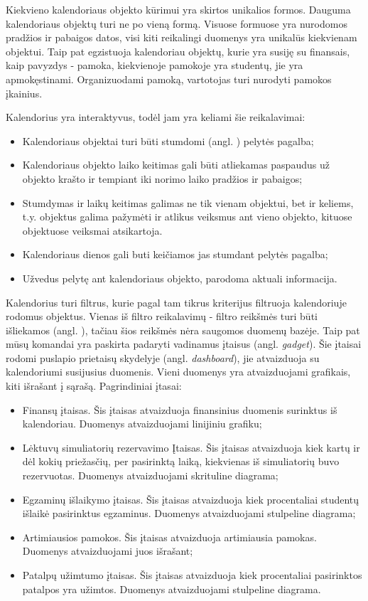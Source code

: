 \documentclass{VUMIFPSbakalaurinis}
\begin{document}
Kiekvieno kalendoriaus objekto kūrimui yra skirtos unikalios formos. Dauguma kalendoriaus objektų turi ne po vieną formą. Visuose formuose yra nurodomos pradžios ir pabaigos datos, visi kiti reikalingi duomenys yra unikalūs kiekvienam objektui. Taip pat egzistuoja kalendoriau objektų, kurie yra susiję su finansais, kaip pavyzdys - pamoka, kiekvienoje pamokoje yra studentų, jie yra apmokęstinami. Organizuodami pamoką, vartotojas turi nurodyti pamokos įkainius.

Kalendorius yra interaktyvus, todėl jam yra keliami šie reikalavimai: 
\begin{itemize}
    \item Kalendoriaus objektai turi būti stumdomi (angl. ) pelytės pagalba;
    \item Kalendoriaus objekto laiko keitimas gali būti atliekamas paspaudus už objekto krašto ir tempiant iki norimo laiko pradžios ir pabaigos;
    \item Stumdymas ir laikų keitimas galimas ne tik vienam objektui, bet ir keliems, t.y. objektus galima pažymėti ir atlikus veiksmus ant vieno objekto, kituose objektuose veiksmai atsikartoja.
    \item Kalendoriaus dienos gali buti keičiamos jas stumdant pelytės pagalba;
    \item Užvedus pelytę ant kalendoriaus objekto, parodoma aktuali informacija.
\end{itemize}

Kalendorius turi filtrus, kurie pagal tam tikrus kriterijus filtruoja kalendoriuje rodomus objektus. Vienas iš filtro reikalavimų - filtro reikšmės turi būti išliekamos (angl. ), tačiau šios reikšmės nėra saugomos duomenų bazėje. Taip pat mūsų komandai yra paskirta padaryti vadinamus įtaisus (angl. \textit{gadget}). Šie įtaisai rodomi puslapio prietaisų skydelyje (angl. \textit{dashboard}), jie atvaizduoja su kalendoriumi susijusius duomenis. Vieni duomenys yra atvaizduojami grafikais, kiti išrašant į sąrašą. Pagrindiniai įtasai:
\begin{itemize}
    \item Finansų įtaisas. Šis įtaisas atvaizduoja finansinius duomenis surinktus iš kalendoriau. Duomenys atvaizduojami linijiniu grafiku;
    \item Lėktuvų simuliatorių rezervavimo Įtaisas. Šis įtaisas atvaizduoja kiek kartų ir dėl kokių priežasčių, per pasirinktą laiką, kiekvienas iš simuliatorių buvo rezervuotas. Duomenys atvaizduojami skrituline diagrama;
    \item Egzaminų išlaikymo įtaisas. Šis įtaisas atvaizduoja kiek procentaliai studentų išlaikė pasirinktus egzaminus. Duomenys atvaizduojami stulpeline diagrama;
    \item Artimiausios pamokos. Šis įtaisas atvaizduoja artimiausia pamokas. Duomenys atvaizduojami juos išrašant;
    \item Patalpų užimtumo įtaisas. Šis įtaisas atvaizduoja kiek procentaliai pasirinktos patalpos yra užimtos. Duomenys atvaizduojami stulpeline diagrama.
\end{itemize}
\end{document}
